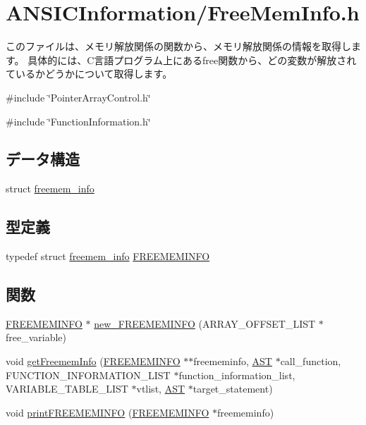 \section{ANSICInformation/FreeMemInfo.h}
\label{FreeMemInfo_8h}


このファイルは、メモリ解放関係の関数から、メモリ解放関係の情報を取得します。 具体的には、C言語プログラム上にあるfree関数から、どの変数が解放されているかどうかについて取得します。  


{\ttfamily \#include \char`\"{}PointerArrayControl.h\char`\"{}}\par
{\ttfamily \#include \char`\"{}FunctionInformation.h\char`\"{}}\par
\subsection*{データ構造}
\begin{DoxyCompactItemize}
\item 
struct \hyperlink{structfreemem__info}{freemem\_\-info}
\end{DoxyCompactItemize}
\subsection*{型定義}
\begin{DoxyCompactItemize}
\item 
typedef struct \hyperlink{structfreemem__info}{freemem\_\-info} \hyperlink{FreeMemInfo_8h_a9a97a736b52d4cbc7fdf9069a8caccb1}{FREEMEMINFO}
\end{DoxyCompactItemize}
\subsection*{関数}
\begin{DoxyCompactItemize}
\item 
\hyperlink{structfreemem__info}{FREEMEMINFO} $\ast$ \hyperlink{FreeMemInfo_8h_a7c3d2f791f8c0f22639a6c8eb31c71b7}{new\_\-FREEMEMINFO} (ARRAY\_\-OFFSET\_\-LIST $\ast$free\_\-variable)
\item 
void \hyperlink{FreeMemInfo_8h_a77d47b49aed920cf9c5bd24f364153dd}{getFreememInfo} (\hyperlink{structfreemem__info}{FREEMEMINFO} $\ast$$\ast$freememinfo, \hyperlink{structabstract__syntax__tree}{AST} $\ast$call\_\-function, FUNCTION\_\-INFORMATION\_\-LIST $\ast$function\_\-information\_\-list, VARIABLE\_\-TABLE\_\-LIST $\ast$vtlist, \hyperlink{structabstract__syntax__tree}{AST} $\ast$target\_\-statement)
\item 
void \hyperlink{FreeMemInfo_8h_ad4fd95936820494011ea2f39b9ea5fde}{printFREEMEMINFO} (\hyperlink{structfreemem__info}{FREEMEMINFO} $\ast$freememinfo)
\end{DoxyCompactItemize}


